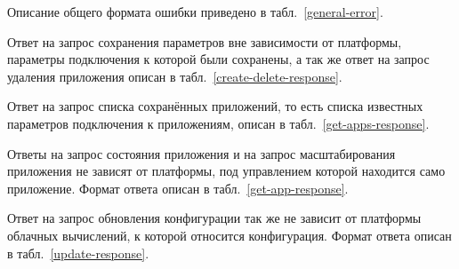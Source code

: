 Описание общего формата ошибки приведено в табл.~\ref{general-error}.

Ответ на запрос сохранения параметров вне зависимости от платформы, параметры подключения к которой были сохранены, а так же ответ на запрос удаления приложения описан в табл.~\ref{create-delete-response}.

Ответ на запрос списка сохранённых приложений, то есть списка известных параметров подключения к приложениям, описан в табл.~\ref{get-apps-response}.

Ответы на запрос состояния приложения и на запрос масштабирования приложения не зависят от платформы, под управлением которой находится само приложение. Формат ответа описан в табл.~\ref{get-app-response}.

Ответ на запрос обновления конфигурации так же не зависит от платформы облачных вычислений, к которой относится конфигурация.
Формат ответа описан в табл.~\ref{update-response}.
